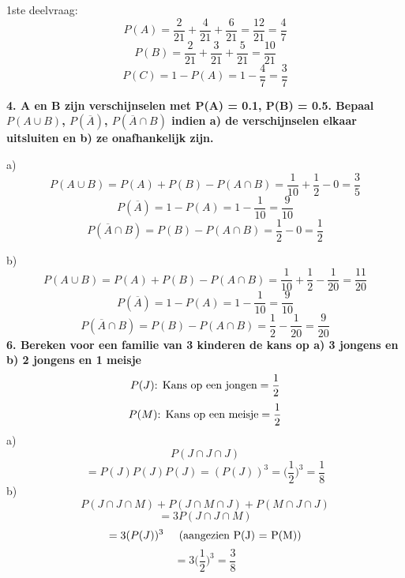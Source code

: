 \documentclass[12pt]{report}
\begin{document}
  1ste deelvraag:
  $$P(A) = \frac{2}{21} + \frac{4}{21} + \frac{6}{21} = \frac{12}{21} = \frac{4}{7}$$
  $$P(B) = \frac{2}{21} + \frac{3}{21} + \frac{5}{21} = \frac{10}{21}$$
  $$P(C) = 1 - P(A) = 1 - \frac{4}{7} = \frac{3}{7}$$
  
  \textbf{4. A en B zijn verschijnselen met P(A) = 0.1, P(B) = 0.5. Bepaal $P(A \cup B)$, $P(\overline{A})$, $P(\overline{A} \cap B)$ indien a) de verschijnselen elkaar uitsluiten en b) ze onafhankelijk zijn.}
  
  a) 
  $$P(A \cup B) = P(A) + P(B) - P(A \cap B) = \frac{1}{10} + \frac{1}{2} - 0 = \frac{3}{5}$$
  $$P(\overline{A}) = 1 - P(A) = 1 - \frac{1}{10} = \frac{9}{10}$$
  $$P(\overline{A} \cap B) = P(B) - P(A \cap B) = \frac{1}{2} - 0 = \frac{1}{2}$$
  
  b)
  $$P(A \cup B) = P(A) + P(B)  - P(A \cap B) = \frac{1}{10} + \frac{1}{2} - \frac{1}{20} = \frac{11}{20}$$
  $$P(\overline{A}) = 1 - P(A) = 1 - \frac{1}{10} = \frac{9}{10}$$
  $$P(\overline{A} \cap B) = P(B) - P(A \cap B) = \frac{1}{2} - \frac{1}{20} = \frac{9}{20}$$
  \textbf{6. Bereken voor een familie van 3 kinderen de kans op a) 3 jongens en  b) 2 jongens en 1 meisje}
  $$P(J) \hbox{: Kans op een jongen} = \frac{1}{2}$$
  $$P(M) \hbox{: Kans op een meisje} = \frac{1}{2}$$
  a)
  $$P(J \cap J \cap J)$$
  $$= P(J)P(J)P(J) = (P(J))^{3} = \bigg(\frac{1}{2}\bigg)^{3} = \frac{1}{8}$$
  b)
  $$P(J \cap J \cap M) + P(J \cap M \cap J) + P(M \cap J \cap J)$$
  $$= 3P(J \cap J \cap M)$$
  $$= 3(P(J))^3 \;\;\;\;\; \hbox{(aangezien P(J) = P(M))}$$ 
  $$= 3 \bigg(\frac{1}{2}\bigg)^{3} = \frac{3}{8}$$
\end{document}
